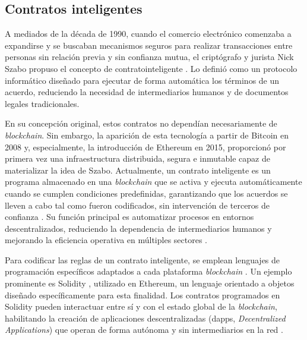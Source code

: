 \subsection{Contratos inteligentes}
\label{sec:smart-contracts}

A mediados de la década de 1990, cuando el comercio electrónico comenzaba a expandirse y se buscaban mecanismos seguros para realizar transacciones entre personas sin relación previa y sin confianza mutua, el criptógrafo y jurista Nick Szabo propuso el concepto de \gls{contratointeligente} \cite{buterin2013ethereum}. Lo definió como un protocolo informático diseñado para ejecutar de forma automática los términos de un acuerdo, reduciendo la necesidad de intermediarios humanos y de documentos legales tradicionales.

En su concepción original, estos contratos no dependían necesariamente de \textit{blockchain}. Sin embargo, la aparición de esta tecnología a partir de Bitcoin en 2008 y, especialmente, la introducción de Ethereum en 2015, proporcionó por primera vez una infraestructura distribuida, segura e inmutable capaz de materializar la idea de Szabo. Actualmente, un contrato inteligente es un programa almacenado en una \textit{blockchain} que se activa y ejecuta automáticamente cuando se cumplen condiciones predefinidas, garantizando que los acuerdos se lleven a cabo tal como fueron codificados, sin intervención de terceros de confianza \cite{bulkowska2023implementation}. Su función principal es automatizar procesos en entornos descentralizados, reduciendo la dependencia de intermediarios humanos \cite{verma2023overview} y mejorando la eficiencia operativa en múltiples sectores \cite{sunny2022systematic}.

Para codificar las reglas de un contrato inteligente, se emplean lenguajes de programación específicos adaptados a cada plataforma \textit{blockchain} \cite{bartolomeo2020introduccion}. Un ejemplo prominente es Solidity \cite{taherdoost2023smart}, utilizado en Ethereum, un lenguaje orientado a objetos diseñado específicamente para esta finalidad. Los contratos programados en Solidity pueden interactuar entre sí y con el estado global de la \textit{blockchain}, habilitando la creación de aplicaciones descentralizadas (\gls{dapps}, \textit{Decentralized Applications}) que operan de forma autónoma y sin intermediarios en la red \cite{buterin2013ethereum}.

